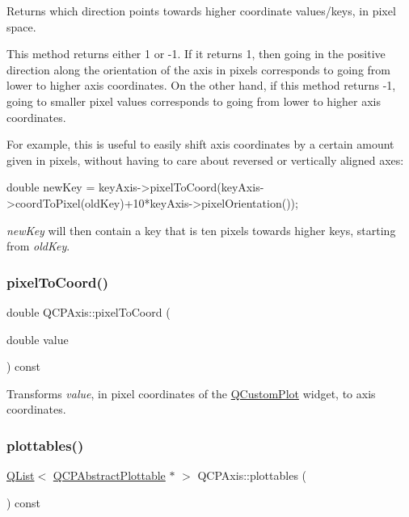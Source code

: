 Returns which direction points towards higher coordinate values/keys, in pixel space.

This method returns either 1 or -\/1. If it returns 1, then going in the positive direction along the orientation of the axis in pixels corresponds to going from lower to higher axis coordinates. On the other hand, if this method returns -\/1, going to smaller pixel values corresponds to going from lower to higher axis coordinates.

For example, this is useful to easily shift axis coordinates by a certain amount given in pixels, without having to care about reversed or vertically aligned axes\+:


\begin{DoxyCode}
\textcolor{keywordtype}{double} newKey = keyAxis->pixelToCoord(keyAxis->coordToPixel(oldKey)+10*keyAxis->pixelOrientation());
\end{DoxyCode}


{\itshape new\+Key} will then contain a key that is ten pixels towards higher keys, starting from {\itshape old\+Key}. \mbox{\label{class_q_c_p_axis_a536ef8f624cac59b6b6fdcb495723c57}} 
\subsubsection{\texorpdfstring{pixel\+To\+Coord()}{pixelToCoord()}}
{\footnotesize\ttfamily double Q\+C\+P\+Axis\+::pixel\+To\+Coord (\begin{DoxyParamCaption}\item[{double}]{value }\end{DoxyParamCaption}) const}

Transforms {\itshape value}, in pixel coordinates of the \hyperlink{class_q_custom_plot}{Q\+Custom\+Plot} widget, to axis coordinates. \mbox{\label{class_q_c_p_axis_ac5e0f6f65c75efb5fd32275d6e4ef0d6}} 
\subsubsection{\texorpdfstring{plottables()}{plottables()}}
{\footnotesize\ttfamily \hyperlink{class_q_list}{Q\+List}$<$ \hyperlink{class_q_c_p_abstract_plottable}{Q\+C\+P\+Abstract\+Plottable} $\ast$ $>$ Q\+C\+P\+Axis\+::plottables (\begin{DoxyParamCaption}{ }\end{DoxyParamCaption}) const}

